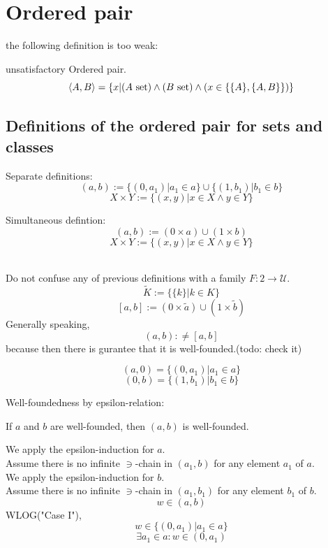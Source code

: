 \def\topic{}

\section{Ordered pair}
the following definition is too weak:
\begin{definition}
\label{def:ordered pair} unsatisfactory
Ordered pair. %
\[
\langle A,B \rangle=\{x|(A\mathrm{\ set})\land(B\mathrm{\ set})\land (x\in\{\{A\},\{A,B\}\})\}
\]
\end{definition}

\subsection{Definitions of the ordered pair for sets and classes}
Separate definitions:
\[
(a,b) := \{(0,a_1)|a_1\in a\}\cup \{(1,b_1)|b_1\in b\}
\]
\[
X\times Y := \{(x,y)|x\in X \land y\in Y\}
\]

\noindent Simultaneous defintion:
\[
(a,b) := ({0}\times a)\cup ({1}\times b)
\]
\[
X\times Y := \{(x,y)|x\in X \land y\in Y\}
\]

\begin{remark}\ \\
Do not confuse any of previous definitions with a family $F:2\to\mathcal{U}$.
\[
\tilde{K}:= \{\{k\}| k\in K\}
\]
\[
[a,b] := ({0}\times \tilde{a})\cup ({1}\times \tilde{b})
\]
Generally speaking,
\[
(a,b) :\neq [a,b]
\]
because then there is gurantee that it is well-founded.(todo: check it)\\
\end{remark}



\[
(a,0) = \{(0,a_1)|a_1\in a\}
\]
\[
(0,b) = \{(1,b_1)|b_1\in b\}
\]


Well-foundedness by epsilon-relation:\\
\begin{theorem}
If $a$ and $b$ are well-founded, then $(a,b)$ is well-founded.
\end{theorem}
\Proof
We apply the epsilon-induction for $a$.\\ %
Assume there is no infinite $\ni$-chain in $(a_1,b)$ for any element $a_1$ of $a$.\\
We apply the epsilon-induction for $b$.\\
Assume there is no infinite $\ni$-chain in $(a_1,b_1)$ for any element $b_1$ of $b$.\\
\[
w\in (a,b)
\]
WLOG("Case I"), 
\[
w\in \{(0,a_1)|a_1\in a\}
\]
\[
\exists a_1\in a: w\in (0,a_1)
\]

